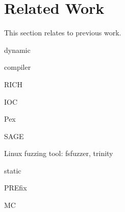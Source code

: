 \section{Related Work}
\label{s:relwk}

This section relates \sys to previous work.

dynamic

compiler

RICH~\cite{brumley:rich}

IOC

Pex

SAGE

Linux fuzzing tool: fsfuzzer, trinity

static

PREfix~\cite{moy:prefix}

MC
